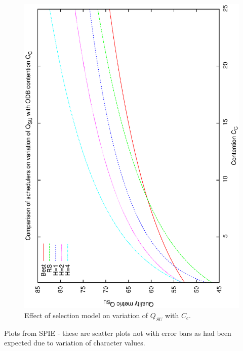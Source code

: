 \begin{figure}[h]
 \label{fig:qsucc_allfit}
\begin{center}
 \includegraphics[scale=0.5, angle=-90]{figures/qsucc_allfit.eps}
 \caption[Effect of selection model on variation of $Q_{SU}$ with $C_c$.] 
   {Effect of selection model on variation of $Q_{SU}$ with $C_c$.}
\end{center}
\end{figure}


Plots from SPIE - these are scatter plots not with error bars as had been expected due to variation of character values.

